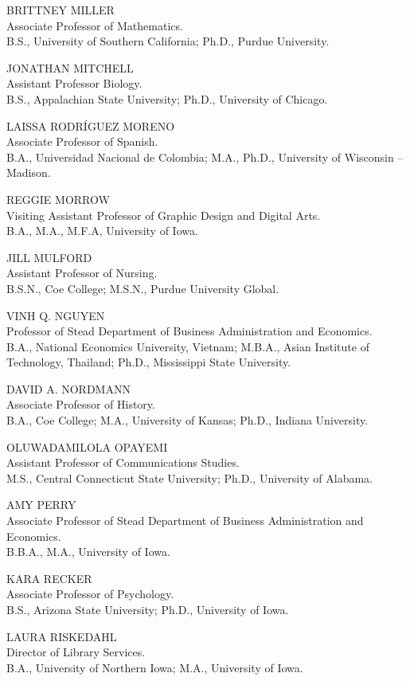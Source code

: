 \documentclass[
  letterpaper,
]{scrbook}
\begin{document}
BRITTNEY MILLER\\
Associate Professor of Mathematics.\\
B.S., University of Southern California; Ph.D., Purdue University.

JONATHAN MITCHELL\\
Assistant Professor Biology.\\
B.S., Appalachian State University; Ph.D., University of Chicago.

LAISSA RODRÍGUEZ MORENO\\
Associate Professor of Spanish.\\
B.A., Universidad Nacional de Colombia; M.A., Ph.D., University of
Wisconsin -- Madison.

REGGIE MORROW\\
Visiting Assistant Professor of Graphic Design and Digital Arts.\\
B.A., M.A., M.F.A, University of Iowa.

JILL MULFORD\\
Assistant Professor of Nursing.\\
B.S.N., Coe College; M.S.N., Purdue University Global.

VINH Q. NGUYEN\\
Professor of Stead Department of Business Administration and
Economics.\\
B.A., National Economics University, Vietnam; M.B.A., Asian Institute of
Technology, Thailand; Ph.D., Mississippi State University.

DAVID A. NORDMANN\\
Associate Professor of History.\\
B.A., Coe College; M.A., University of Kansas; Ph.D., Indiana
University.

OLUWADAMILOLA OPAYEMI\\
Assistant Professor of Communications Studies.\\
M.S., Central Connecticut State University; Ph.D., University of
Alabama.

AMY PERRY\\
Associate Professor of Stead Department of Business Administration and
Economics.\\
B.B.A., M.A., University of Iowa.

KARA RECKER\\
Associate Professor of Psychology.\\
B.S., Arizona State University; Ph.D., University of Iowa.

LAURA RISKEDAHL\\
Director of Library Services.\\
B.A., University of Northern Iowa; M.A., University of Iowa.
\end{document}
